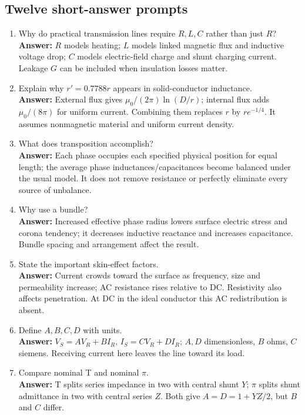 \documentclass[11pt,a4paper]{article}
\begin{document}
\subsection{Twelve short-answer prompts}
\begin{enumerate}
\item Why do practical transmission lines require $R,L,C$ rather than just $R$?\\
\textbf{Answer:} $R$ models heating; $L$ models linked magnetic flux and inductive voltage drop; $C$ models electric-field charge and shunt charging current. Leakage $G$ can be included when insulation losses matter.
\item Explain why $r'=0.7788r$ appears in solid-conductor inductance.\\
\textbf{Answer:} External flux gives $\mu_0/(2\pi)\ln(D/r)$; internal flux adds $\mu_0/(8\pi)$ for uniform current. Combining them replaces $r$ by $re^{-1/4}$. It assumes nonmagnetic material and uniform current density.
\item What does transposition accomplish?\\
\textbf{Answer:} Each phase occupies each specified physical position for equal length; the average phase inductances/capacitances become balanced under the usual model. It does not remove resistance or perfectly eliminate every source of unbalance.
\item Why use a bundle?\\
\textbf{Answer:} Increased effective phase radius lowers surface electric stress and corona tendency; it decreases inductive reactance and increases capacitance. Bundle spacing and arrangement affect the result.
\item State the important skin-effect factors.\\
\textbf{Answer:} Current crowds toward the surface as frequency, size and permeability increase; AC resistance rises relative to DC. Resistivity also affects penetration. At DC in the ideal conductor this AC redistribution is absent.
\item Define $A,B,C,D$ with units.\\
\textbf{Answer:} $V_S=AV_R+BI_R$, $I_S=CV_R+DI_R$; $A,D$ dimensionless, $B$ ohms, $C$ siemens. Receiving current here leaves the line toward its load.
\item Compare nominal T and nominal $\pi$.\\
\textbf{Answer:} T splits series impedance in two with central shunt $Y$; $\pi$ splits shunt admittance in two with central series $Z$. Both give $A=D=1+YZ/2$, but $B$ and $C$ differ.

\end{enumerate}
\end{document}
